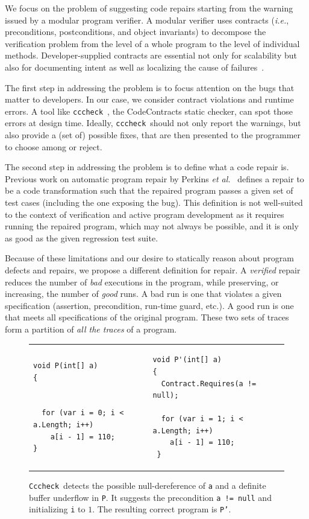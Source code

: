\documentclass[10pt]{sigplanconf}
\newcommand{\labelFig}[1]{\label{fig:#1}}
\newcommand{\code}[1]{\texttt{#1}}
\newcommand{\clousot}{\code{cccheck}}
\newcommand{\Clousot}{\code{Cccheck}}
\begin{document}
We focus on the problem of suggesting code repairs starting from the
warning issued by a  modular program verifier. 
A modular verifier uses contracts (\emph{i.e.}, preconditions, postconditions,
and object invariants) to
decompose the verification problem from the level of a whole program
to the level of individual methods.  Developer-supplied contracts are
essential not only for scalability but also for documenting intent as
well as localizing the cause of failures~\cite{MeyerIEEEComputer92}.

The first step in addressing the problem is to focus attention on the
bugs that matter to developers. 
In our case, we consider contract violations and runtime errors.
A tool like \clousot~\cite{cccheck}, the CodeContracts static checker, can spot those errors at design time.
Ideally, \clousot\ should not only report the warnings, 
but also provide a (set of) possible fixes, that are
then presented to the programmer to choose among or reject.

The second step in addressing the problem is to define what a code
repair is. Previous work on automatic program repair by Perkins
\emph{et al.}~\cite{PerkinsEtAl09} defines a repair to be a code
transformation such that the repaired program passes a given set of
test cases (including the one exposing the bug). This definition is
not well-suited to the context of verification and active program
development as it requires running the repaired program, which may not
always be possible, and it is only as good as the given regression
test suite.

Because of these limitations and our desire to statically reason about
program defects and repairs, we propose a different definition for
repair. A \emph{verified} repair reduces the number of
\emph{bad} executions in the program, while preserving, or 
increasing, the number of \emph{good} runs.  A bad run is one that
violates a given specification (assertion, precondition, run-time
guard, etc.).  A good run is one that meets all specifications of
the original program. These two sets of traces form a partition of
{\em all the traces} of a program.


\begin{figure}[th]
\centering
\begin{tabular}{l|l}
\begin{lstlisting}
void P(int[] a)
{


  for (var i = 0; i < a.Length; i++)
    a[i - 1] = 110;
}
\end{lstlisting} &
\begin{lstlisting}
void P'(int[] a)
{
  Contract.Requires(a != null);

  for (var i = 1; i < a.Length; i++)
    a[i - 1] = 110;
 }
\end{lstlisting}
\end{tabular}
\caption{\Clousot\ detects the possible null-dereference of \code{a} and a definite buffer underflow in  \code{P}.  
It suggests the precondition \code{a != null} and initializing
\code{i} to $1$.  The resulting correct program is \code{P'}.}
\labelFig{ForExample}
\end{figure}
\end{document}
